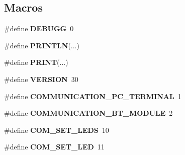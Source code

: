 \subsection*{Macros}
\begin{DoxyCompactItemize}
\item 
\hypertarget{group___engduino_protocol_ga30d9b8759178d9c4b1fa253aa97f11a0}{}\#define {\bfseries D\+E\+B\+U\+G\+G}~0\label{group___engduino_protocol_ga30d9b8759178d9c4b1fa253aa97f11a0}

\item 
\hypertarget{group___engduino_protocol_ga1f9db1dc616fc2004e22f9f442bb212b}{}\#define {\bfseries P\+R\+I\+N\+T\+L\+N}(...)\label{group___engduino_protocol_ga1f9db1dc616fc2004e22f9f442bb212b}

\item 
\hypertarget{group___engduino_protocol_ga15bb631053a1fce9c5470701900984c7}{}\#define {\bfseries P\+R\+I\+N\+T}(...)\label{group___engduino_protocol_ga15bb631053a1fce9c5470701900984c7}

\item 
\hypertarget{group___engduino_protocol_ga1c6d5de492ac61ad29aec7aa9a436bbf}{}\#define {\bfseries V\+E\+R\+S\+I\+O\+N}~30\label{group___engduino_protocol_ga1c6d5de492ac61ad29aec7aa9a436bbf}

\item 
\hypertarget{group___engduino_protocol_ga47be49f3ef02b7a56e854d30403936c6}{}\#define {\bfseries C\+O\+M\+M\+U\+N\+I\+C\+A\+T\+I\+O\+N\+\_\+\+P\+C\+\_\+\+T\+E\+R\+M\+I\+N\+A\+L}~1\label{group___engduino_protocol_ga47be49f3ef02b7a56e854d30403936c6}

\item 
\hypertarget{group___engduino_protocol_gadb24326f10f104c32b6d7fb73e5701ff}{}\#define {\bfseries C\+O\+M\+M\+U\+N\+I\+C\+A\+T\+I\+O\+N\+\_\+\+B\+T\+\_\+\+M\+O\+D\+U\+L\+E}~2\label{group___engduino_protocol_gadb24326f10f104c32b6d7fb73e5701ff}

\item 
\hypertarget{group___engduino_protocol_ga12d62278c7072cab5d977ea9e430cfcd}{}\#define {\bfseries C\+O\+M\+\_\+\+S\+E\+T\+\_\+\+L\+E\+D\+S}~10\label{group___engduino_protocol_ga12d62278c7072cab5d977ea9e430cfcd}

\item 
\hypertarget{group___engduino_protocol_gacc57d94492c9cd3a63f1cd3b888a3bdd}{}\#define {\bfseries C\+O\+M\+\_\+\+S\+E\+T\+\_\+\+L\+E\+D}~11\label{group___engduino_protocol_gacc57d94492c9cd3a63f1cd3b888a3bdd}


\end{DoxyCompactItemize}
